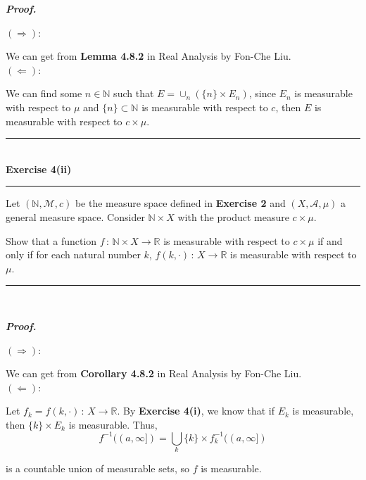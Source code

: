 \documentclass[a4paper,11pt]{article}
\begin{document}
\textbf{\textit{Proof.}}

$(\Rightarrow)$:

We can get from \textbf{Lemma 4.8.2} in Real Analysis by Fon-Che Liu.\\

$(\Leftarrow)$:

We can find some $n \in \mathbb{N}$ such that $E = \cup_n (\{n\} \times E_n)$, since $E_n$ is measurable with respect to $\mu$ and $\{n\} \subset \mathbb{N}$ is measurable with respect to $c$, then $E$ is measurable with respect to $c \times \mu$.\\



\begin{flushleft}
	\rule[-0.5ex]{17cm}{2pt}\\
		\textbf{Exercise 4(ii)}\\
	\rule[1.5ex]{17cm}{0.5pt}
		Let $(\mathbb{N},\mathcal{M},c)$ be the measure space defined in \textbf{Exercise 2} and $(X, \mathcal{A}, \mu)$ a general measure space. Consider $\mathbb{N} \times X$ with the product measure $c \times \mu$.

		Show that a function $f\,:\,\mathbb{N} \times X \to \mathbb{R}$ is measurable with respect to $c \times \mu$ if and only if for each natural number $k$, $f(k,\cdot)\,:\,X \to \mathbb{R}$ is measurable with respect to $\mu$.
	\rule[1.0ex]{17cm}{0.5pt}\
\end{flushleft}

\textbf{\textit{Proof.}}

$(\Rightarrow)$:

We can get from \textbf{Corollary 4.8.2} in Real Analysis by Fon-Che Liu.\\


$(\Leftarrow)$:

Let $f_k = f(k,\cdot)\,:\,X \to \mathbb{R}$. By \textbf{Exercise 4(i)}, we know that if $E_k$ is measurable, then $\{k\} \times E_k$ is measurable. Thus,
	$$f^{-1}((a, \infty]) = \bigcup_k \{k\} \times f_k^{-1}((a,\infty])$$

is a countable union of measurable sets, so $f$ is measurable.\\
\end{document}
